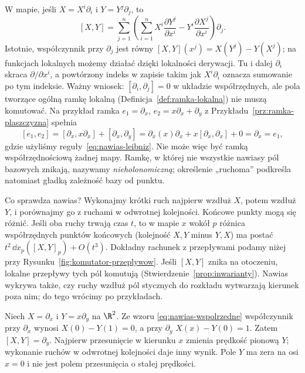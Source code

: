 W mapie, jeśli $X=X^i\partial_i$ i $Y=Y^j\partial_j$, to
\begin{equation}\label{eq:nawias-wspolrzedne}
 [X,Y]=\sum_{j=1}^{n}\left(\sum_{i=1}^{n}
 X^i\frac{\partial Y^j}{\partial x^i}-
 Y^i\frac{\partial X^j}{\partial x^i}\right)\partial_j.
\end{equation}
Istotnie, współczynnik przy $\partial_j$ jest równy
$[X,Y](x^j)=X(Y^j)-Y(X^j)$; na funkcjach lokalnych możemy
działać dzięki lokalności derywacji. Tu i dalej $\partial_i$
skraca $\partial/\partial x^i$, a powtórzony indeks w zapisie
takim jak $X^i\partial_i$ oznacza sumowanie po tym indeksie.
Ważny wniosek: $[\partial_i,\partial_j]=0$ w układzie współrzędnych,
ale pola tworzące ogólną ramkę lokalną
(Definicja~\ref{def:ramka-lokalna}) nie muszą komutować.
Na przykład ramka $e_1=\partial_x$,
$e_2=x\partial_x+\partial_y$ z
Przykładu~\ref{prz:ramka-plaszczyzna} spełnia
\[
 [e_1,e_2]
 =[\partial_x,x\partial_x]+[\partial_x,\partial_y]
 =\partial_x(x)\partial_x+x[\partial_x,\partial_x]+0
 =\partial_x=e_1,
\]
gdzie użyliśmy reguły~\eqref{eq:nawias-leibniz}.
Nie może więc być ramką współrzędnościową żadnej mapy.
Ramkę, w której nie wszystkie nawiasy pól bazowych znikają,
nazywamy \emph{nieholonomiczną}; określenie „ruchoma”
podkreśla natomiast gładką zależność bazy od punktu.

Co sprawdza nawias? Wykonajmy krótki ruch najpierw wzdłuż $X$,
potem wzdłuż $Y$, i porównajmy go z ruchami w odwrotnej kolejności.
Końcowe punkty mogą się różnić. Jeśli oba ruchy trwają czas $t$,
to w mapie $x$ wokół $p$ różnica współrzędnych punktów końcowych
(kolejność $X,Y$ minus $Y,X$) ma postać
$t^2\,\dd x_p([X,Y]_p)+O(t^3)$. Dokładny rachunek z przepływami podamy
niżej przy Rysunku~\ref{fig:komutator-przeplywow}.
Jeśli $[X,Y]$ znika na otoczeniu, lokalne przepływy tych pól
komutują (Stwierdzenie~\ref{prop:inwarianty}).
Nawias wykrywa także, czy ruchy wzdłuż pól stycznych do rozkładu
wytwarzają kierunek poza nim; do tego wrócimy po przykładach.

\begin{przyklad}\label{prz:scinanie}
Niech $X=\partial_x$ i $Y=x\partial_y$ na $\R^2$.
Ze wzoru \eqref{eq:nawias-wspolrzedne} współczynnik przy
$\partial_x$ wynosi $X(0)-Y(1)=0$, a przy $\partial_y$
$X(x)-Y(0)=1$. Zatem $[X,Y]=\partial_y$.
Najpierw przesunięcie w kierunku $x$
zmienia prędkość pionową $Y$; wykonanie ruchów w odwrotnej kolejności
daje inny wynik. Pole $Y$ ma zera na osi $x=0$ i nie jest polem
przesunięcia o stałej prędkości.
\end{przyklad}


